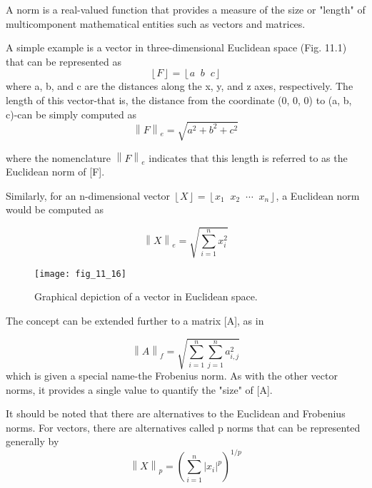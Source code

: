 \documentclass[../main.tex]{subfiles}
\begin{document}
A norm is a real-valued function that provides a measure of the size or "length" of multicomponent mathematical entities such as vectors and matrices.

A simple example is a vector in three-dimensional Euclidean space (Fig. 11.1) that can be represented as
\begin{equation}
\left \lfloor F \right \rfloor =\left \lfloor a\;\;b\;\;c \right \rfloor 
\end{equation}
where a, b, and c are the distances along the x, y, and z axes, respectively. The length of this vector-that is, the distance from the coordinate (0, 0, 0) to (a, b, c)-can be simply computed as
\begin{equation}
\left \| F \right \|_{e}=
\sqrt{a^{2}+b^{2}+c^{2}}
\end{equation}

where the nomenclature $\left \| F \right \|_{e}$ indicates that this length is referred to as the Euclidean norm of [F].

Similarly, for an n-dimensional vector $\left \lfloor X \right \rfloor = \left \lfloor x_{1}\;\; x_{2}\;\; \cdots \;\; x_{n} \right \rfloor$, a Euclidean norm would be computed as

\begin{equation}
\left \| X \right \|_{e}=
\sqrt{\sum_{i=1}^{n}x_{i}^{2}}
\end{equation}
\begin{figure}[H]
	\centering
	\texttt{[image: fig\_11\_16]}
	\caption{\textsf{Graphical depiction of a vector in Euclidean space.}}
	\label{fig:fig_11_16}
\end{figure}

The concept can be extended further to a matrix [A], as in

\begin{equation}
\left \| A \right \|_{f}=
\sqrt{\sum_{i=1}^{n}\sum_{j=1}^{n}a_{i,j}^{2}}
\tag{11.5}
\end{equation}
which is given a special name-the Frobenius norm. As with the other vector norms, it provides a single value to quantify the "size" of [A].

It should be noted that there are alternatives to the Euclidean and Frobenius norms. For vectors, there are alternatives called p norms that can be represented generally by
\begin{equation}
\left \| X \right \|_{p}=
\left ( \sum_{i=1}^{n}\left | x_{i} \right |^{p} \right )^{1/p}
\end{equation}
\end{document}
